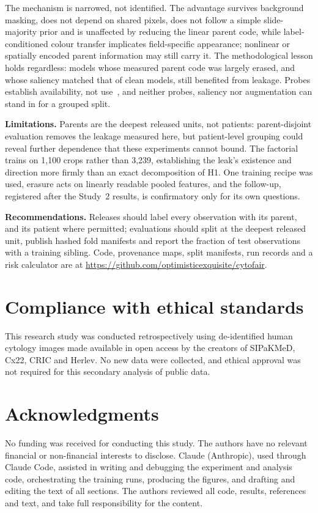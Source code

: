 \documentclass{article}
\begin{document}
The mechanism is narrowed, not identified. The advantage survives background masking, does not depend on shared pixels, does not follow a simple slide-majority prior and is unaffected by reducing the linear parent code, while label-conditioned colour transfer implicates field-specific appearance; nonlinear or spatially encoded parent information may still carry it. The methodological lesson holds regardless: models whose measured parent code was largely erased, and whose saliency matched that of clean models, still benefited from leakage. Probes establish availability, not use~\cite{elazar2021amnesic,ravichander2021probing}, and neither probes, saliency nor augmentation can stand in for a grouped split.

\textbf{Limitations.} Parents are the deepest released units, not patients: parent-disjoint evaluation removes the leakage measured here, but patient-level grouping could reveal further dependence that these experiments cannot bound. The factorial trains on 1,100 crops rather than 3,239, establishing the leak's existence and direction more firmly than an exact decomposition of H1. One training recipe was used, erasure acts on linearly readable pooled features, and the follow-up, registered after the Study~2 results, is confirmatory only for its own questions.

\textbf{Recommendations.} Releases should label every observation with its parent, and its patient where permitted; evaluations should split at the deepest released unit, publish hashed fold manifests and report the fraction of test observations with a training sibling. Code, provenance maps, split manifests, run records and a risk calculator are at \url{https://github.com/optimisticexquisite/cytofair}.

\section{Compliance with ethical standards}
\label{sec:ethics}

This research study was conducted retrospectively using de-identified human cytology images made available in open access by the creators of SIPaKMeD, Cx22, CRIC and Herlev. No new data were collected, and ethical approval was not required for this secondary analysis of public data.

\section{Acknowledgments}
\label{sec:acknowledgments}

No funding was received for conducting this study. The authors have no relevant financial or non-financial interests to disclose. Claude (Anthropic), used through Claude Code, assisted in writing and debugging the experiment and analysis code, orchestrating the training runs, producing the figures, and drafting and editing the text of all sections. The authors reviewed all code, results, references and text, and take full responsibility for the content.



\end{document}
